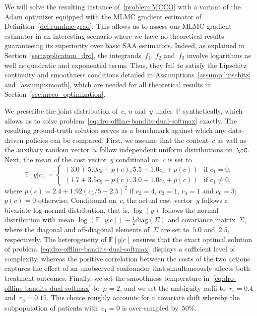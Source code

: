 \documentclass[11pt]{article}
\begin{document}
We will solve the resulting instance of~\eqref{problem:MCCO} with a variant of the Adam optimizer \cite{kingma2014adam} equipped with the MLMC gradient estimator of Definition~\ref{def:rumlmc-grad}. This allows us to assess our MLMC gradient estimator in an interesting scenario where we have no theoretical results guaranteeing its superiority over basic SAA estimators. Indeed, as  explained in Section~\ref{sec:application_dro}, the integrands~$f_1$, $f_2$ and~$f_3$ involve logarithms as well as quadratic and exponential terms. Thus, they fail to satisfy the Lipschitz continuity and smoothness conditions detailed in Assumptions~\ref{assump:lipschitz} and~\ref{assump:smooth}, which are needed for all theoretical results in Section~\ref{sec:mcco_optimization}.

We prescribe the joint distribution of~$c$, $u$ and~$y$ under~$\mathbb P$ synthetically, which allows us to solve problem~\eqref{eq:dro-offline-bandits-dual-softmax} exactly. The resulting ground-truth solution serves as a benchmark against which any data-driven policies can be compared. First, we assume that the context~$c$ as well as the auxiliary random vector~$u$ follow independent uniform distributions on~$\cC$. Next, the mean of the cost vector~$y$ conditional on~$c$ is set to
\[
    \mathbb E[y|c] = \left\{ \begin{array}{ll}
    (3.0 + 5.0 c_5+p(c), 5.5 + 1.0 c_5+p(c)) & \text{if }c_1 = 0 ,\\
     (1.7 + 3.5 c_5+p(c) , 3.0 + 1.0 c_5+p(c)) & \text{if }c_1 \neq 0,
    \end{array} \right.
\]
where $p(c)=2.4+1.92(c_5/5-2.5)^2$ if $c_2=4$, $c_3=1$, $c_4=1$ and $c_6=3$; $p(c)=0$ otherwise. Conditional on~$c$, the actual cost vector~$y$ follows a bivariate log-normal distribution, that is, $\log(y)$ follows the normal distribution with mean $\log(\mathbb E[y|c]) - \frac{1}{2}\text{diag}(\Sigma)$ and covariance matrix~$\Sigma$, where the diagonal and off-diagonal elements of~$\Sigma$ are set to~$5.0$ and~$2.5$, respectively. The heterogeneity of $\mathbb E[y|c]$ ensures that the exact optimal solution of problem~\eqref{eq:dro-offline-bandits-dual-softmax} displays a sufficient level of complexity, whereas the positive correlation between the costs of the two actions captures the effect of an unobserved confounder that simultaneously affects both treatment outcomes. Finally, we set the smoothness temperature in~\eqref{eq:dro-offline-bandits-dual-softmax} to~$\mu=2$, and we set the ambiguity radii to~$r_c=0.4$ and~$r_y = 0.15$. This choice roughly accounts for a covariate shift whereby the subpopulation of patients with~$c_1=0$ is over-sampled by~$50\%$. 
\end{document}
